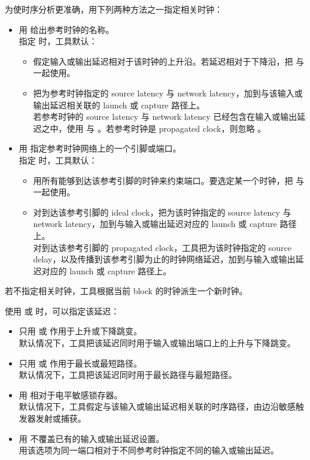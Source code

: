 为使时序分析更准确，用下列两种方法之一指定相关时钟：
\begin{itemize}
  \item 用  给出参考时钟的名称。\\
        指定  时，工具默认：
        \begin{itemize}
          \item 假定输入或输出延迟相对于该时钟的上升沿。若延迟相对于下降沿，把  与  一起使用。
          \item 把为参考时钟指定的 source latency 与 network latency，加到与该输入或输出延迟相关联的 launch 或 capture 路径上。\\
                若参考时钟的 source latency 与 network latency 已经包含在输入或输出延迟之中，使用  与 。若参考时钟是 propagated clock，则忽略 。
        \end{itemize}
  \item 用  指定参考时钟网络上的一个引脚或端口。\\
        指定  时，工具默认：
        \begin{itemize}
          \item 用所有能够到达该参考引脚的时钟来约束端口。要选定某一个时钟，把  与  一起使用。
          \item 对到达该参考引脚的 ideal clock，把为该时钟指定的 source latency 与 network latency，加到与输入或输出延迟对应的 launch 或 capture 路径上。\\
                对到达该参考引脚的 propagated clock，工具把为该时钟指定的 source delay，以及传播到该参考引脚为止的时钟网络延迟，加到与输入或输出延迟对应的 launch 或 capture 路径上。
        \end{itemize}
\end{itemize}

若不指定相关时钟，工具根据当前 block 的时钟派生一个新时钟。

使用  或  时，可以指定该延迟：
\begin{itemize}
  \item 只用  或  作用于上升或下降跳变。\\
        默认情况下，工具把该延迟同时用于输入或输出端口上的上升与下降跳变。
  \item 只用  或  作用于最长或最短路径。\\
        默认情况下，工具把该延迟同时用于最长路径与最短路径。
  \item 用  相对于电平敏感锁存器。\\
        默认情况下，工具假定与该输入或输出延迟相关联的时序路径，由边沿敏感触发器发射或捕获。
  \item 用  不覆盖已有的输入或输出延迟设置。\\
        用该选项为同一端口相对于不同参考时钟指定不同的输入或输出延迟。
\end{itemize}

